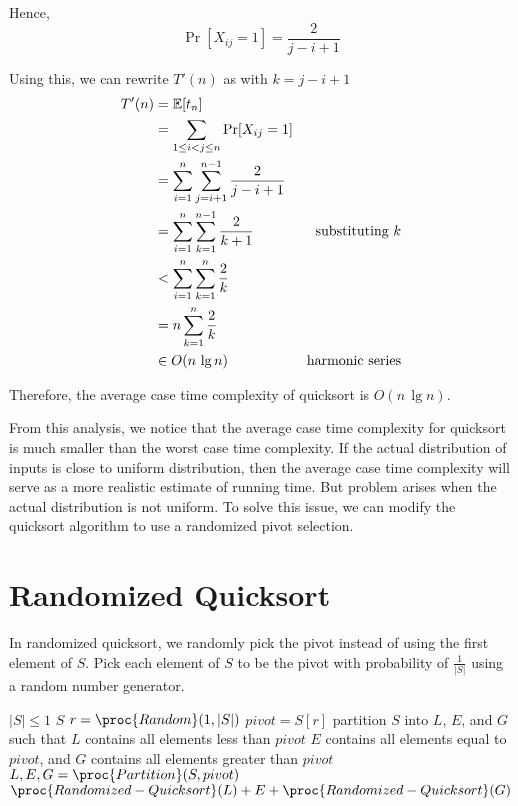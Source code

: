 \begin{enumerate}
    Hence,
    $$
    \Pr[X_{ij} = 1] = \frac{2}{j-i+1}
    $$

    Using this, we can rewrite $T'(n)$ as with $k = j-i+1$ 
    $$
    \begin{aligned}
        T'(n) &= \mathbb{E}[t_n] \\
        &= \sum_{1 \leq i < j \leq n} \Pr[X_{ij} = 1] \\
        &= \sum_{i=1}^n \sum_{j=i+1}^{n-1} \frac{2}{j-i+1} \\
        &= \sum_{i=1}^n \sum_{k=1}^{n-1} \frac{2}{k+1} & \text{substituting $k$} \\
        &< \sum_{i=1}^n \sum_{k=1}^n \frac{2}{k} \\
        &= n \sum_{k=1}^n \frac{2}{k} \\
        &\in O(n\, \lg n) & \text{harmonic series} \\
    \end{aligned}
    $$

    Therefore, the average case time complexity of quicksort is $O(n \, \lg n)$.
\end{enumerate}

From this analysis, we notice that the average case time complexity for quicksort is much smaller than the worst case time complexity. If the actual distribution of inputs is close to uniform distribution, then the average case time complexity will serve as a more realistic estimate of running time. But problem arises when the actual distribution is not uniform. To solve this issue, we can modify the quicksort algorithm to use a randomized pivot selection.

\section{Randomized Quicksort}

In randomized quicksort, we randomly pick the pivot instead of using the first element of $S$. Pick each element of $S$ to be the pivot with probability of $\displaystyle \frac{1}{|S|}$ using a random number generator. 

\begin{codebox}
    \li \If $|S| \leq 1$
    \li \Then \Return $S$ \End
    \li $r = \proc{Random}(1,|S|)$
    \li $pivot = S[r]$ 
    \zi \Comment partition $S$ into $L$, $E$, and $G$ such that $L$ contains all elements less than $pivot$
    \zi \Comment $E$ contains all elements equal to $pivot$, and $G$ contains all elements greater than $pivot$
    \li $L,E,G = \proc{Partition}(S,pivot)$
    \li \Return $\proc{Randomized-Quicksort}(L) + E + \proc{Randomized-Quicksort}(G)$
\end{codebox}


